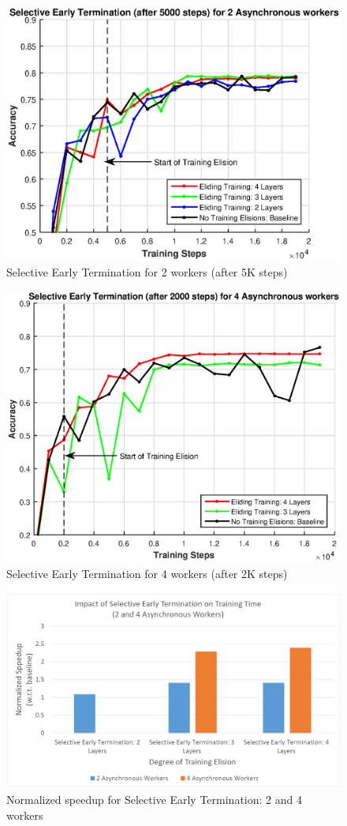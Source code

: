 \begin{figure}[t]
	\centering
	\includegraphics[width=0.8\columnwidth]{figures/fig8.eps}
	\caption{Selective Early Termination for 2 workers (after 5K steps)}
	\label{fig:fig8}
\end{figure}
\begin{figure}[t]
	\centering
	\includegraphics[width=0.8\columnwidth]{figures/fig9.eps}
	\caption{Selective Early Termination for 4 workers (after 2K steps)}
	\label{fig:fig9}
\end{figure}
\begin{figure}[t]
	\centering
	\includegraphics[width=0.8\columnwidth]{figures/fig10.PNG}
	\caption{Normalized speedup for Selective Early Termination: 2 and 4 workers}
	\label{fig:fig10}
\end{figure}

